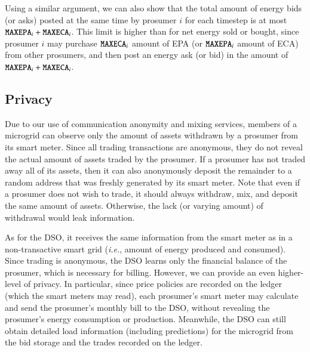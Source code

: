 Using a similar argument, we can also show that the total amount of energy bids (or asks) posted at
the same time by prosumer $i$ for each timestep is at most
$\texttt{MAXEPA}_i + \texttt{MAXECA}_i$.  This limit is higher than for
net energy sold or bought, since prosumer $i$ may purchase
$\texttt{MAXECA}_i$ amount of EPA (or $\texttt{MAXEPA}_i$ amount of ECA)
from other prosumers, and then post an energy ask (or bid) in the
amount of $\texttt{MAXEPA}_i + \texttt{MAXECA}_i$.

\subsection{Privacy}
Due to our use of communication anonymity and mixing services, members
of a microgrid can observe only the amount of assets withdrawn by a
prosumer from its smart meter.
Since all trading transactions are anonymous, they do not reveal the
actual amount of assets traded by the prosumer.  If a prosumer has not traded away all of its assets, %
then it can also anonymously deposit the remainder to
a random address that was freshly generated by its smart meter. Note that even
if a prosumer does not wish to trade, it should always
withdraw, mix, and deposit the same amount of assets.  Otherwise, the
lack (or varying amount) of withdrawal would leak information.

As for the DSO, it receives the same information from the smart meter
as in a non-transactive smart grid (\emph{i.e.}, amount of energy
produced and consumed).  Since trading is anonymous, the DSO learns
only the financial balance of the prosumer, which is necessary for
billing.  However, we can provide an even higher-level of privacy.  In
particular, since price policies are recorded on the ledger (which the
smart meters may read), each prosumer's smart meter may calculate and
send the prosumer's monthly bill to the DSO, without revealing the
prosumer's energy consumption or production.  Meanwhile, the DSO can
still obtain detailed load information (including predictions) for the
microgrid from the bid storage and the trades recorded on the ledger.

